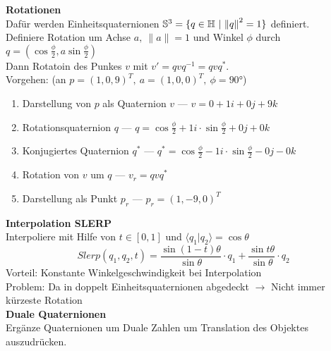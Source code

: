 \textbf{Rotationen}\\
Dafür werden Einheitsquaternionen \(\mathbb{S}^3 = \{q \in \quaternionen\ \lvert\ {\|{q}\|}^2 = 1\}\) definiert.\\
Definiere Rotation um Achse \(a,\ \|a\| = 1\) und Winkel \(\phi\) durch \(q = (\cos \frac{\phi}{2}, a \sin \frac{\phi}{2})\)\\
Dann Rotatoin des Punkes \(v\) mit \(v' = qvq^{-1} = qvq^*\).\\
Vorgehen: (an \(p = {(1, 0, 9)}^T,\ a = {(1, 0, 0)}^T,\ \phi = \ang{90}\))
\begin{enumerate}
\item Darstellung von \(p\) als Quaternion \(v\) --- \(v = 0 + 1i + 0j + 9k\)
\item Rotationsquaternion \(q\) --- \( q = \cos \frac{\phi}{2} + 1i \cdot \sin \frac{\phi}{2} + 0j + 0k\)
\item Konjugiertes Quaternion \(q^*\) --- \(q^* = \cos \frac{\phi}{2} - 1i \cdot \sin \frac{\phi}{2} - 0j -0k\)
\item Rotation von \(v\) um \(q\) --- \(v_r = qvq^*\)
\item Darstellung als Punkt \(p_r\) --- \(p_r = {(1, -9, 0)}^T\)
\end{enumerate}

\textbf{Interpolation SLERP}\\
Interpoliere mit Hilfe von \(t \in [0, 1]\) und \(\langle q_1 \lvert q_2 \rangle = \cos \theta\)
\[ \mathit{Slerp}(q_1, q_2, t) = \frac{\sin(1-t)\theta}{\sin \theta} \cdot q_1 + \frac{\sin t\theta}{\sin \theta} \cdot q_2 \]
Vorteil: Konstante Winkelgeschwindigkeit bei Interpolation\\
Problem: Da in \SO doppelt Einheitsquaternionen abgedeckt \(\rightarrow\) Nicht immer kürzeste Rotation\\

\textbf{Duale Quaternionen}\\
Ergänze Quaternionen um Duale Zahlen um Translation des Objektes auszudrücken.